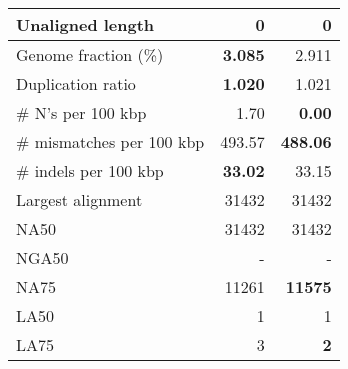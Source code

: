 \documentclass[12pt,a4paper]{article}
\begin{document}
\begin{table}[ht]
\begin{center}
\begin{tabular}{|l*{2}{|r}|}
Unaligned length & 0 & 0 \\ \hline
Genome fraction (\%) & {\bf 3.085} & 2.911 \\ \hline
Duplication ratio & {\bf 1.020} & 1.021 \\ \hline
\# N's per 100 kbp & 1.70 & {\bf 0.00} \\ \hline
\# mismatches per 100 kbp & 493.57 & {\bf 488.06} \\ \hline
\# indels per 100 kbp & {\bf 33.02} & 33.15 \\ \hline
Largest alignment & 31432 & 31432 \\ \hline
NA50 & 31432 & 31432 \\ \hline
NGA50 & - & - \\ \hline
NA75 & 11261 & {\bf 11575} \\ \hline
LA50 & 1 & 1 \\ \hline
LA75 & 3 & {\bf 2} \\ \hline
\end{tabular}
\end{center}
\end{table}
\end{document}
